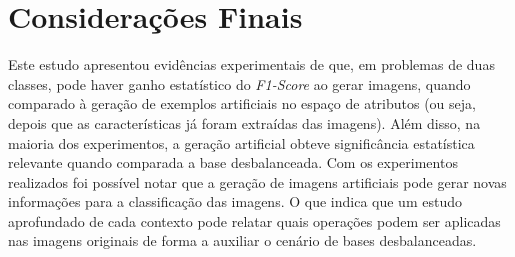\section{Considerações Finais}

Este estudo apresentou evidências experimentais de que, em problemas de duas classes, pode haver ganho estatístico do \textit{F1-Score} ao gerar imagens, quando comparado à geração de exemplos artificiais no espaço de atributos (ou seja, depois que as características já foram extraídas das imagens). Além disso, na maioria dos experimentos, a geração artificial obteve significância estatística relevante quando comparada a base desbalanceada. Com os experimentos realizados foi possível notar que a geração de imagens artificiais pode gerar novas informações para a classificação das imagens. O que indica que um estudo aprofundado de cada contexto pode relatar quais operações podem ser aplicadas nas imagens originais de forma a auxiliar o cenário de bases desbalanceadas.
